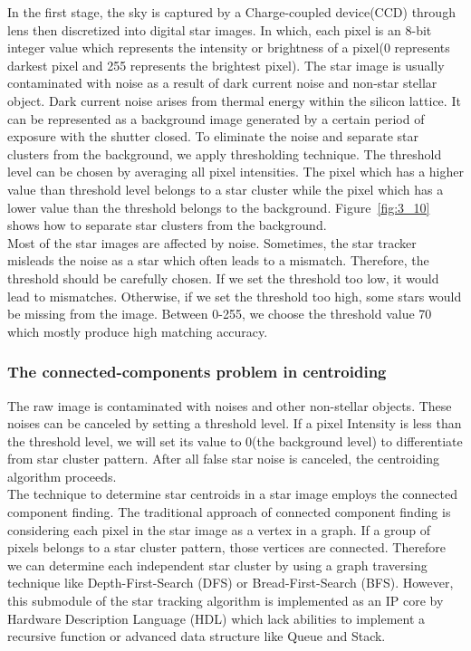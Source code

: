 In the first stage, the sky is captured by a Charge-coupled device(CCD) through lens then discretized into digital star images. In which, each pixel is an 8-bit integer value which represents the intensity or brightness of a pixel(0 represents darkest pixel and 255 represents the brightest pixel). The star image is usually contaminated with noise as a result of dark current noise and non-star stellar object. Dark current noise arises from thermal energy within the silicon lattice. It can be represented as a background image generated by a certain period of exposure with the shutter closed\cite{MDP}. To eliminate the noise and separate star clusters from the background, we apply thresholding technique. The threshold level can be chosen by averaging all pixel intensities. The pixel which has a higher value than threshold level belongs to a star cluster while the pixel which has a lower value than the threshold belongs to the background. Figure~\ref{fig:3_10} shows how to separate star clusters from the background. \\

\noindent Most of the star images are affected by noise. Sometimes, the star tracker misleads the noise as a star which often leads to a mismatch. Therefore, the threshold should be carefully chosen. If we set the threshold too low, it would lead to mismatches. Otherwise, if we set the threshold too high, some stars would be missing from the image. Between 0-255, we choose the threshold value 70 which mostly produce high matching accuracy.



\subsubsection{The connected-components problem in centroiding}

The raw image is contaminated with noises and other non-stellar objects. These noises can be canceled by setting a threshold level. If a pixel Intensity is less than the threshold level, we will set its value to 0(the background level) to differentiate from star cluster pattern. After all false star noise is canceled, the centroiding algorithm proceeds. \\

\noindent The technique to determine star centroids in a star image employs the connected component finding. The traditional approach of connected component finding is considering each pixel in the star image as a vertex in a graph. If a group of pixels belongs to a star cluster pattern, those vertices are connected. Therefore we can determine each independent star cluster by using a graph traversing technique like Depth-First-Search (DFS) or Bread-First-Search (BFS). However, this submodule of the star tracking algorithm is implemented as an IP core by Hardware Description Language (HDL) which lack abilities to implement a recursive function or advanced data structure like Queue and Stack. \\

